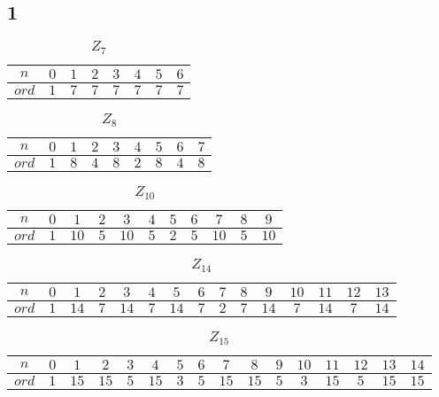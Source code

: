 \documentclass{article}
\begin{document}
		\subsection*{1}
			\begin{table}[!htp]
				\centering
				\caption{$Z_{7}$}
				\begin{tabular}{c|*{7}{c}}
					\toprule
					$n$ & $0$ & $1$ & $2$ & $3$ & $4$ & $5$ & $6$ \\ \midrule
					$ord$ & $1$ & $7$ & $7$ & $7$ & $7$ & $7$ & $7$ \\ \bottomrule
				\end{tabular}
			\end{table}
			\begin{table}[!htp]
				\centering
				\caption{$Z_{8}$}
				\begin{tabular}{c|*{8}{c}}
					\toprule
					$n$ & $0$ & $1$ & $2$ & $3$ & $4$ & $5$ & $6$ & $7$ \\ \midrule
					$ord$ & $1$ & $8$ & $4$ & $8$ & $2$ & $8$ & $4$ & $8$ \\ \bottomrule
				\end{tabular}
			\end{table}
			\begin{table}[!htp]
				\centering
				\caption{$Z_{10}$}
				\begin{tabular}{c|*{10}{c}}
					\toprule
					$n$ & $0$ & $1$ & $2$ & $3$ & $4$ & $5$ & $6$ & $7$ & $8$ & $9$ \\ \midrule
					$ord$ & $1$ & $10$ & $5$ & $10$ & $5$ & $2$ & $5$ & $10$ & $5$ & $10$ \\ \bottomrule
				\end{tabular}
			\end{table}
			\begin{table}[!htp]
				\centering
				\caption{$Z_{14}$}
				\begin{tabular}{c|*{14}{c}}
					\toprule
					$n$ & $0$ & $1$ & $2$ & $3$ & $4$ & $5$ & $6$ & $7$ & $8$ & $9$ & $10$ & $11$ & $12$ & $13$ \\ \midrule
					$ord$ & $1$ & $14$ & $7$ & $14$ & $7$ & $14$ & $7$ & $2$ & $7$ & $14$ & $7$ & $14$ & $7$ & $14$ \\ \bottomrule
				\end{tabular}
			\end{table}
			\begin{table}[!htp]
				\centering
				\caption{$Z_{15}$}
				\begin{tabular}{c|*{15}{c}}
					\toprule
					$n$ & $0$ & $1$ & $2$ & $3$ & $4$ & $5$ & $6$ & $7$ & $8$ & $9$ & $10$ & $11$ & $12$ & $13$ & $14$ \\ \midrule
					$ord$ & $1$ & $15$ & $15$ & $5$ & $15$ & $3$ & $5$ & $15$ & $15$ & $5$ & $3$ & $15$ & $5$ & $15$ & $15$ \\ \bottomrule
				\end{tabular}
			\end{table}
\end{document}
